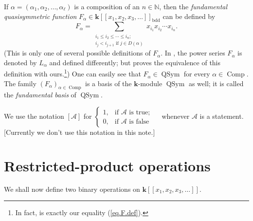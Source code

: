 \documentclass
[numbers=enddot,12pt,final,onecolumn,notitlepage,abstracton]{scrartcl}%
\theoremstyle{definition}
\newenvironment{noncompile}{}{}
\let\sumnonlimits\sum
\renewcommand{\sum}{\sumnonlimits\limits}
\begin{document}
If $\alpha=\left(  \alpha_{1},\alpha_{2},\ldots,\alpha_{\ell}\right)  $ is a
composition of an $n\in\mathbb{N}$, then the \textit{fundamental
quasisymmetric function }$F_{\alpha}\in\mathbf{k}\left[  \left[  x_{1}%
,x_{2},x_{3},\ldots\right]  \right]  _{\operatorname*{bdd}}$ can be defined by%
\begin{equation}
F_{\alpha}=\sum_{\substack{i_{1}\leq i_{2}\leq\cdots\leq i_{n};\\i_{j}%
<i_{j+1}\text{ if }j\in D\left(  \alpha\right)  }}x_{i_{1}}x_{i_{2}}\cdots
x_{i_{n}}. \label{eq.F.def}%
\end{equation}
(This is only one of several possible definitions of $F_{\alpha}$. In
\cite[Definition 5.2.4]{Reiner}, the power series $F_{\alpha}$ is denoted by
$L_{\alpha}$ and defined differently; but \cite[Proposition 5.2.9]{Reiner}
proves the equivalence of this definition with ours.\footnote{In fact,
\cite[(5.2.3)]{Reiner} is exactly our equality (\ref{eq.F.def}).}) One can
easily see that $F_{\alpha}\in\operatorname*{QSym}$ for every $\alpha
\in\operatorname*{Comp}$. The family $\left(  F_{\alpha}\right)  _{\alpha
\in\operatorname*{Comp}}$ is a basis of the $\mathbf{k}$-module
$\operatorname*{QSym}$ as well; it is called the \textit{fundamental basis} of
$\operatorname*{QSym}$.

\begin{noncompile}
We use the notation $\left[  \mathcal{A}\right]  $ for $%
\begin{cases}
1, & \text{if }\mathcal{A}\text{ is true;}\\
0, & \text{if }\mathcal{A}\text{ is false}%
\end{cases}
\quad$ whenever $\mathcal{A}$ is a statement. [Currently we don't use this
notation in this note.]
\end{noncompile}

\section{\label{sect.dendri}Restricted-product operations}

We shall now define two binary operations on $\mathbf{k}\left[  \left[
x_{1},x_{2},x_{3},\ldots\right]  \right]  $.
\end{document}
